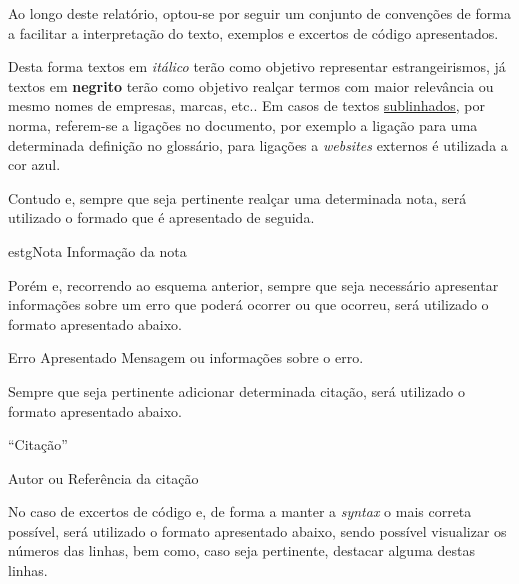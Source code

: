 
Ao longo deste relatório, optou-se por seguir um conjunto de convenções de forma a facilitar a interpretação do texto, exemplos e excertos de código apresentados.

Desta forma textos em \textit{itálico} terão como objetivo representar estrangeirismos, já textos em \textbf{negrito} terão como objetivo realçar termos com maior relevância ou mesmo nomes de empresas, marcas, etc.. Em casos de textos \underline{sublinhados}, por norma, referem-se a ligações no documento, por exemplo a ligação para uma determinada definição no glossário, para ligações a \textit{websites} externos é utilizada a cor {\color{blue}azul}.

Contudo e, sempre que seja pertinente realçar uma determinada nota, será utilizado o formado que é apresentado de seguida.

\vspace{0.01cm}

\begin{mybox}{estg}{Nota}
	Informação da nota
\end{mybox}

\vspace{0.1cm}

Porém e, recorrendo ao esquema anterior, sempre que seja necessário apresentar informações sobre um erro que poderá ocorrer ou que ocorreu, será utilizado o formato apresentado abaixo.

\vspace{0.01cm}

\begin{errorbox}{Erro Apresentado}
Mensagem ou informações sobre o erro.
\end{errorbox}

\vspace{0.1cm}

Sempre que seja pertinente adicionar determinada citação, será utilizado o formato apresentado abaixo.

\begin{flushright}
	\begin{quotebox50}
		``Citação''

		\tcblower

		Autor ou Referência da citação
	\end{quotebox50}
\end{flushright}

\vspace{0.1cm}

No caso de excertos de código e, de forma a manter a \textit{syntax} o mais correta possível, será utilizado o formato apresentado abaixo, sendo possível visualizar os números das linhas, bem como, caso seja pertinente, destacar alguma destas linhas.


